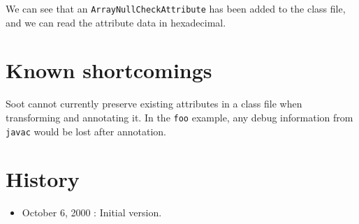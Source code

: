 \documentclass{article}
\begin{document}
We can see that an {\tt ArrayNullCheckAttribute} has been added to
the class file, and we can read the attribute data in hexadecimal.

\section*{Known shortcomings}
Soot cannot currently preserve existing attributes in a class file
when transforming and annotating it.  In the {\tt foo} example,
any debug information from {\tt javac} would be lost after annotation.

\section*{History}
\begin{itemize}
\item October 6, 2000 : Initial version.
\end{itemize}
\end{document}

